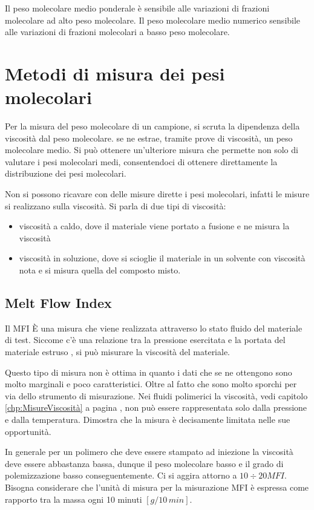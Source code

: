 Il peso molecolare medio ponderale è sensibile alle variazioni di frazioni molecolare ad alto peso molecolare.
Il peso molecolare medio numerico sensibile alle variazioni di frazioni molecolari a basso peso molecolare.

\section{Metodi di misura dei pesi molecolari}
Per la misura del peso molecolare di un campione, si scruta la dipendenza della viscosità dal peso molecolare. 
se ne estrae, tramite prove di viscosità, un peso molecolare medio. 
Si può ottenere un'ulteriore misura che permette non solo di valutare i pesi molecolari medi, consentendoci di ottenere direttamente la distribuzione dei pesi molecolari.

Non si possono ricavare con delle misure dirette i pesi molecolari, infatti le misure si realizzano sulla viscosità. 
Si parla di due tipi di viscosità: 
\begin{itemize}
\item viscosità a caldo, dove il materiale viene portato a fusione e ne misura la viscosità
\item viscosità in soluzione, dove si scioglie il materiale in un solvente con viscosità nota e si misura quella del composto misto.
\end{itemize}

\subsection{Melt Flow Index}
Il \ac{MFI} È una misura che viene realizzata attraverso lo stato fluido del materiale di test. Siccome c'è una relazione tra la pressione esercitata e la portata del materiale estruso , si può misurare la viscosità del materiale.

Questo tipo di misura non è ottima in quanto i dati che se ne ottengono sono molto marginali e poco caratteristici. Oltre al fatto che sono molto sporchi per via dello strumento di misurazione.
Nei fluidi polimerici la viscosità, vedi capitolo \ref{chp:MisureViscosità} a pagina \pageref{chp:MisureViscosità}, non può essere rappresentata solo dalla pressione e dalla temperatura. Dimostra che la misura è decisamente limitata nelle sue opportunità.

In generale per un polimero che deve essere stampato ad iniezione la viscosità deve essere abbastanza bassa, dunque il peso molecolare basso e il grado di polemizzazione basso conseguentemente. Ci si aggira attorno a $10\div20\unit{MFI}$.
Bisogna considerare che l'unità di misura per la misurazione \ac{MFI} è espressa come rapporto tra la massa ogni 10 minuti $\left[g/10\,min\right]$.

